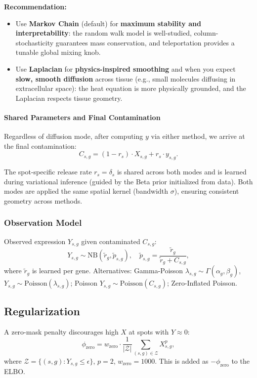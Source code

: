 \documentclass[11pt]{article}
\begin{document}
\textbf{Recommendation:}
\begin{itemize}
  \item Use \textbf{Markov Chain} (default) for \textbf{maximum stability and interpretability}: the random walk model is well-studied, column-stochasticity guarantees mass conservation, and teleportation provides a tunable global mixing knob.
  \item Use \textbf{Laplacian} for \textbf{physics-inspired smoothing} and when you expect \textbf{slow, smooth diffusion} across tissue (e.g., small molecules diffusing in extracellular space): the heat equation is more physically grounded, and the Laplacian respects tissue geometry.
\end{itemize}

\paragraph{Shared Parameters and Final Contamination}

Regardless of diffusion mode, after computing $y$ via either method, we arrive at the final contamination:
\[
C_{s,g} = (1 - r_s) \cdot X_{s,g} + r_s \cdot y_{s,g}.
\]

The spot-specific release rate $r_s = \delta_s$ is shared across both modes and is learned during variational inference (guided by the Beta prior initialized from data). Both modes are applied the same spatial kernel (bandwidth $\sigma$), ensuring consistent geometry across methods.

\subsubsection{Observation Model}
Observed expression $Y_{s,g}$ given contaminated $C_{s,g}$:
\[
Y_{s,g} \sim \text{NB}(\tilde{r}_g, \tilde{p}_{s,g}), \quad \tilde{p}_{s,g} = \frac{\tilde{r}_g}{\tilde{r}_g + C_{s,g}},
\]
where $\tilde{r}_g$ is learned per gene. Alternatives: Gamma-Poisson $\lambda_{s,g} \sim \Gamma(\alpha_g, \beta_g)$, $Y_{s,g} \sim \text{Poisson}(\lambda_{s,g})$; Poisson $Y_{s,g} \sim \text{Poisson}(C_{s,g})$; Zero-Inflated Poisson.

\subsection{Regularization}
A zero-mask penalty discourages high $X$ at spots with $Y \approx 0$:
\[
\phi_{\text{zero}} = w_{\text{zero}} \cdot \frac{1}{|\mathcal{Z}|} \sum_{(s,g) \in \mathcal{Z}} X_{s,g}^p,
\]
where $\mathcal{Z} = \{(s,g) : Y_{s,g} \le \epsilon\}$, $p=2$, $w_{\text{zero}}=1000$. This is added as $-\phi_{\text{zero}}$ to the ELBO.
\end{document}
